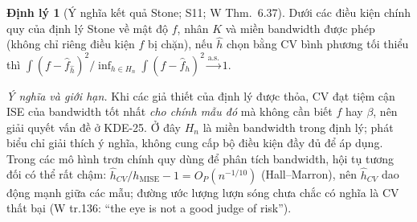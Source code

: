\documentclass[11pt,a4paper]{article}
\theoremstyle{definition}
\newtheorem{thm}{Định lý}
\newcommand{\asto}{\xrightarrow{\mathrm{a.s.}}}
\begin{document}
\begin{thm}[Ý nghĩa kết quả Stone; S11; W Thm.~6.37]
Dưới các điều kiện chính quy của định lý Stone về mật độ $f$, nhân $K$ và miền bandwidth được phép (không chỉ riêng điều kiện $f$ bị chặn), nếu $\widehat h$ chọn bằng CV bình phương tối thiểu thì
$\int(f-\widehat f_{\widehat h})^2\big/\inf_{h\in H_n}\int(f-\widehat f_h)^2\asto1$.
\end{thm}
\noindent\textit{Ý nghĩa và giới hạn.} Khi các giả thiết của định lý được thỏa, CV đạt tiệm cận ISE của bandwidth tốt nhất \emph{cho chính mẫu đó} mà không cần biết $f$ hay $\beta$, nên giải quyết vấn đề ở KDE-25. Ở đây $H_n$ là miền bandwidth trong định lý; phát biểu chỉ giải thích ý nghĩa, không cung cấp bộ điều kiện đầy đủ để áp dụng. Trong các mô hình trơn chính quy dùng để phân tích bandwidth, hội tụ tương đối có thể rất chậm: $\widehat h_{CV}/h_{\mathrm{MISE}}-1=O_P(n^{-1/10})$ (Hall--Marron), nên $\widehat h_{CV}$ dao động mạnh giữa các mẫu; đường ước lượng lượn sóng chưa chắc có nghĩa là CV thất bại (W tr.136: ``the eye is not a good judge of risk'').
\end{document}
